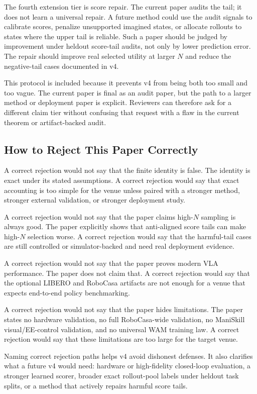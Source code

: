The fourth extension tier is score repair. The current paper audits the tail;
it does not learn a universal repair. A future method could use the audit
signals to calibrate scores, penalize unsupported imagined states, or allocate
rollouts to states where the upper tail is reliable. Such a paper should be
judged by improvement under heldout score-tail audits, not only by lower
prediction error. The repair should improve real selected utility at larger
$N$ and reduce the negative-tail cases documented in v4.

This protocol is included because it prevents v4 from being both too small and
too vague. The current paper is final as an audit paper, but the path to a
larger method or deployment paper is explicit. Reviewers can therefore ask for
a different claim tier without confusing that request with a flaw in the
current theorem or artifact-backed audit.

\subsection{How to Reject This Paper Correctly}
\label{app:reject-correctly}

A correct rejection would not say that the finite identity is false. The
identity is exact under its stated assumptions. A correct rejection would say
that exact accounting is too simple for the venue unless paired with a stronger
method, stronger external validation, or stronger deployment study.

A correct rejection would not say that the paper claims high-$N$ sampling is
always good. The paper explicitly shows that anti-aligned score tails can make
high-$N$ selection worse. A correct rejection would say that the harmful-tail
cases are still controlled or simulator-backed and need real deployment
evidence.

A correct rejection would not say that the paper proves modern VLA
performance. The paper does not claim that. A correct rejection would say that
the optional LIBERO and RoboCasa artifacts are not enough for a venue that
expects end-to-end policy benchmarking.

A correct rejection would not say that the paper hides limitations. The paper
states no hardware validation, no full RoboCasa-wide validation, no ManiSkill
visual/EE-control validation, and no universal WAM training law. A correct
rejection would say that these limitations are too large for the target venue.

Naming correct rejection paths helps v4 avoid dishonest defenses. It also
clarifies what a future v4 would need: hardware or high-fidelity closed-loop
evaluation, a stronger learned scorer, broader exact rollout-pool labels under
heldout task splits, or a method that actively repairs harmful score tails.

